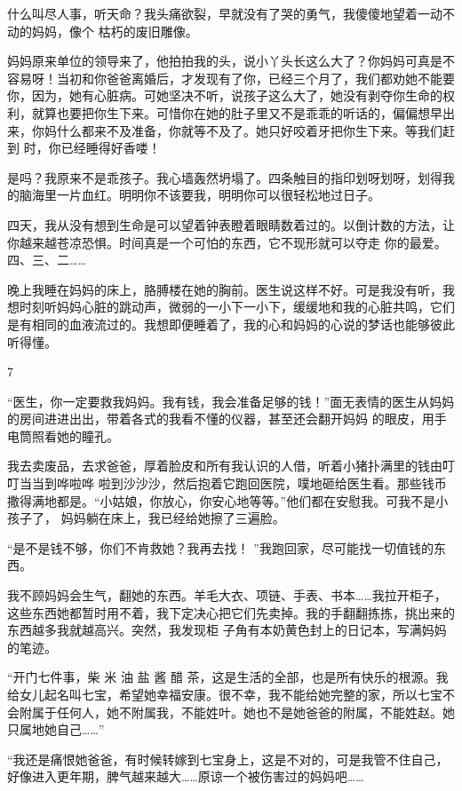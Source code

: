 \documentclass{article}
\begin{document}
什么叫尽人事，听天命？我头痛欲裂，早就没有了哭的勇气，我傻傻地望着一动不动的妈妈，像个
枯朽的废旧雕像。 

妈妈原来单位的领导来了，他拍拍我的头，说小丫头长这么大了？你妈妈可真是不容易呀！当初和你爸爸离婚后，才发现有了你，已经三个月了，我们都劝她不能要你，因为，她有心脏病。可她坚决不听，说孩子这么大了，她没有剥夺你生命的权利，就算也要把你生下来。可惜你在她的肚子里又不是乖乖的听话的，偏偏想早出来，你妈什么都来不及准备，你就等不及了。她只好咬着牙把你生下来。等我们赶到
时，你已经睡得好香喽！ 

是吗？我原来不是乖孩子。我心墙轰然坍塌了。四条触目的指印划呀划呀，划得我的脑海里一片血红。明明你不该要我，明明你可以很轻松地过日子。
\newpage


四天，我从没有想到生命是可以望着钟表瞪着眼睛数着过的。以倒计数的方法，让你越来越苍凉恐惧。时间真是一个可怕的东西，它不现形就可以夺走
你的最爱。四、三、二…… 

晚上我睡在妈妈的床上，胳膊楼在她的胸前。医生说这样不好。可是我没有听，我想时刻听妈妈心脏的跳动声，微弱的一小下一小下，缓缓地和我的心脏共鸣，它们是有相同的血液流过的。我想即便睡着了，我的心和妈妈的心说的梦话也能够彼此听得懂。


7 

“医生，你一定要救我妈妈。我有钱，我会准备足够的钱！”面无表情的医生从妈妈的房间进进出出，带着各式的我看不懂的仪器，甚至还会翻开妈妈
的眼皮，用手电筒照看她的瞳孔。 

我去卖废品，去求爸爸，厚着脸皮和所有我认识的人借，听着小猪扑满里的钱由叮叮当当到哗啦哗
\newpage
啦到沙沙沙，然后抱着它跑回医院，噗地砸给医生看。那些钱币撒得满地都是。“小姑娘，你放心，你安心地等等。”他们都在安慰我。可我不是小孩子了，
妈妈躺在床上，我已经给她擦了三遍脸。 

“是不是钱不够，你们不肯救她？我再去找！
”我跑回家，尽可能找一切值钱的东西。 

我不顾妈妈会生气，翻她的东西。羊毛大衣、项链、手表、书本……我拉开柜子，这些东西她都暂时用不着，我下定决心把它们先卖掉。我的手翻翻拣拣，挑出来的东西越多我就越高兴。突然，我发现柜
子角有本奶黄色封上的日记本，写满妈妈的笔迹。 

“开门七件事，柴 米 油 盐 酱 醋 茶，这是生活的全部，也是所有快乐的根源。我给女儿起名叫七宝，希望她幸福安康。很不幸，我不能给她完整的家，所以七宝不会附属于任何人，她不附属我，不能姓叶。她也不是她爸爸的附属，不能姓赵。她
只属地她自己……” 

\newpage

“我还是痛恨她爸爸，有时候转嫁到七宝身上，这是不对的，可是我管不住自己，好像进入更年期，脾气越来越大……原谅一个被伤害过的妈妈吧……
\end{document}
